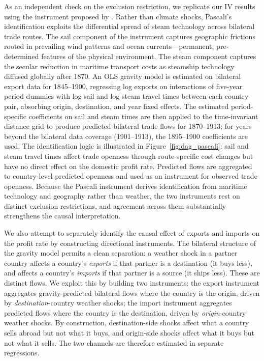 \documentclass[10pt]{article}
\begin{document}
\par As an independent check on the exclusion restriction, we replicate our IV results using the instrument proposed by \citet{Pascali2017}. Rather than climate shocks, Pascali's identification exploits the differential spread of steam technology across bilateral trade routes. The sail component of the instrument captures geographic frictions rooted in prevailing wind patterns and ocean currents---permanent, pre-determined features of the physical environment. The steam component captures the secular reduction in maritime transport costs as steamship technology diffused globally after 1870. An OLS gravity model is estimated on bilateral export data for 1845--1900, regressing log exports on interactions of five-year period dummies with log sail and log steam travel times between each country pair, absorbing origin, destination, and year fixed effects. The estimated period-specific coefficients on sail and steam times are then applied to the time-invariant distance grid to produce predicted bilateral trade flows for 1870--1913; for years beyond the bilateral data coverage (1901--1913), the 1895--1900 coefficients are used. The identification logic is illustrated in Figure~\ref{fig:dag_pascali}: sail and steam travel times affect trade openness through route-specific cost changes but have no direct effect on the domestic profit rate. Predicted flows are aggregated to country-level predicted openness and used as an instrument for observed trade openness. Because the Pascali instrument derives identification from maritime technology and geography rather than weather, the two instruments rest on distinct exclusion restrictions, and agreement across them substantially strengthens the causal interpretation.

\par We also attempt to separately identify the causal effect of exports and imports on the profit rate by constructing directional instruments. The bilateral structure of the gravity model permits a clean separation: a weather shock in a partner country affects a country's \emph{exports} if that partner is a destination (it buys less), and affects a country's \emph{imports} if that partner is a source (it ships less). These are distinct flows. We exploit this by building two instruments: the export instrument aggregates gravity-predicted bilateral flows where the country is the origin, driven by \emph{destination}-country weather shocks; the import instrument aggregates predicted flows where the country is the destination, driven by \emph{origin}-country weather shocks. By construction, destination-side shocks affect what a country sells abroad but not what it buys, and origin-side shocks affect what it buys but not what it sells. The two channels are therefore estimated in separate regressions.
\end{document}
